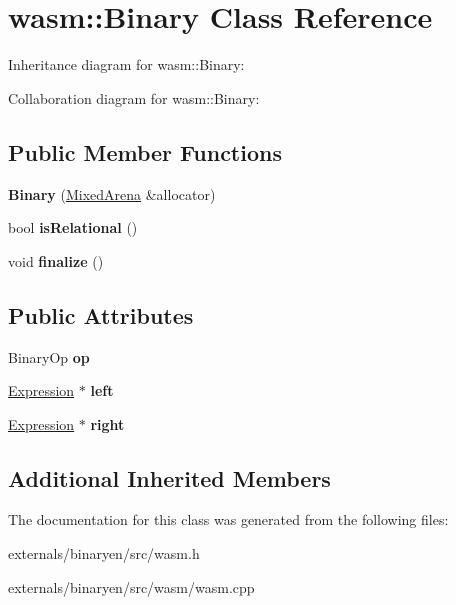 \hypertarget{classwasm_1_1_binary}{}\section{wasm\+:\+:Binary Class Reference}
\label{classwasm_1_1_binary}


Inheritance diagram for wasm\+:\+:Binary\+:


Collaboration diagram for wasm\+:\+:Binary\+:
\subsection*{Public Member Functions}
\begin{DoxyCompactItemize}
\item 
\mbox{\label{classwasm_1_1_binary_a8dd275f4484188bf685cf1d1f0cf7edd}} 
{\bfseries Binary} (\mbox{\hyperlink{struct_mixed_arena}{Mixed\+Arena}} \&allocator)
\item 
\mbox{\label{classwasm_1_1_binary_a1b540bc59ad802509cfb01b56444874b}} 
bool {\bfseries is\+Relational} ()
\item 
\mbox{\label{classwasm_1_1_binary_a65349f58af9b34c1e8927a3b35c8c193}} 
void {\bfseries finalize} ()
\end{DoxyCompactItemize}
\subsection*{Public Attributes}
\begin{DoxyCompactItemize}
\item 
\mbox{\label{classwasm_1_1_binary_a0e5487b3ab3f32b5e69091fae5fef9b9}} 
Binary\+Op {\bfseries op}
\item 
\mbox{\label{classwasm_1_1_binary_aa0760028d1329093f4a52d0241f78541}} 
\mbox{\hyperlink{classwasm_1_1_expression}{Expression}} $\ast$ {\bfseries left}
\item 
\mbox{\label{classwasm_1_1_binary_aa600aa6f2ae58ed26fefdfbec55f60c7}} 
\mbox{\hyperlink{classwasm_1_1_expression}{Expression}} $\ast$ {\bfseries right}
\end{DoxyCompactItemize}
\subsection*{Additional Inherited Members}


The documentation for this class was generated from the following files\+:\begin{DoxyCompactItemize}
\item 
externals/binaryen/src/wasm.\+h\item 
externals/binaryen/src/wasm/wasm.\+cpp\end{DoxyCompactItemize}
